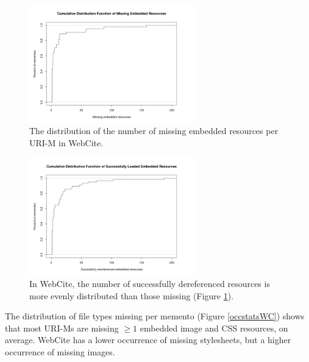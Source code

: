\begin{figure}[h!]
\includegraphics[width=270px]{./imgs/OccStatsCDF.png}
\caption{The distribution of the number of missing embedded resources per URI-M in WebCite.}
\label{missingDistroWC}
\end{figure}


\begin{figure}[h!]
\includegraphics[width=270px]{./imgs/OccStatsFoundCDF.png}
\caption{In WebCite, the number of successfully dereferenced resources is more evenly distributed than those missing (Figure \ref{missingDistroWC}).}
\label{foundDistroWC}
\end{figure}



The distribution of file types missing per memento (Figure \ref{occstatsWC}) shows that most URI-Ms are missing $\ge 1$ embedded image and CSS resources, on average. WebCite has a lower occurrence of missing stylesheets, but a higher occurrence of missing images. %

